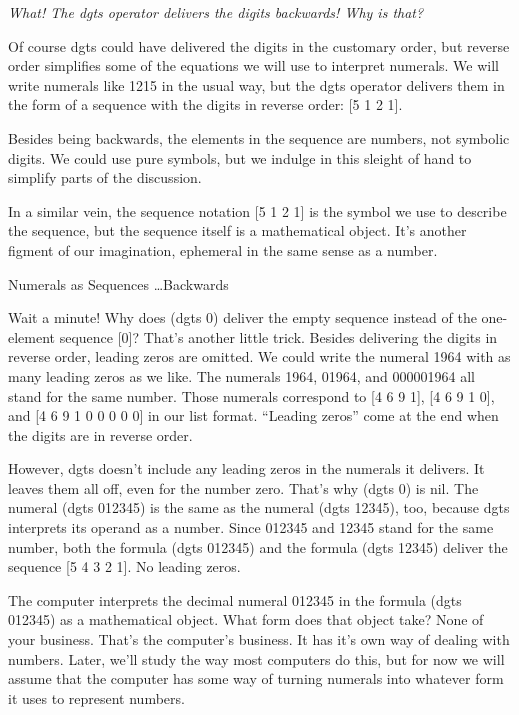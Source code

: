 \begin{aside}
\emph{What! The dgts operator delivers the digits backwards! Why is that?}

Of course
dgts
could have delivered the digits in the
customary order, but reverse order simplifies some of the
equations we will use to interpret numerals.
We will write numerals like 1215 in the usual way, but
the dgts operator delivers them in the form of
a sequence with the digits in reverse order: [5 1 2 1].

Besides being backwards, the elements in the sequence are numbers,
not symbolic digits.
We could use pure symbols, but we indulge in
this sleight of hand to
simplify parts of the discussion.

In a similar vein, the sequence notation [5 1 2 1] is the symbol we use
to describe the sequence,
but the sequence itself is a mathematical object.
It's another figment of our imagination,
ephemeral in the same sense as a number.
\caption{Numerals as Sequences \dots Backwards}
\label{numeral-as-sequence}
\end{aside}

Wait a minute!
Why does (dgts 0) deliver the empty sequence instead of the one-element sequence [0]?
That's another little trick.
Besides delivering the digits in reverse order,
leading zeros are omitted.
We could write the numeral 1964 with as many leading zeros as we like.
The numerals 1964, 01964, and 000001964 all stand for the same number.
Those numerals correspond to [4 6 9 1], [4 6 9 1 0], and [4 6 9 1 0 0 0 0 0]
in our list format. ``Leading zeros'' come at the end when the
digits are in reverse order.

However, dgts doesn't include any
 leading zeros
in the numerals it delivers.
It leaves them all off, even for the number zero.
That's why (dgts 0) is nil.
The numeral (dgts 012345) is the same as the numeral (dgts 12345), too,
because dgts interprets its operand as a number.
Since 012345 and 12345 stand for the same number,
both the formula (dgts 012345) and the formula (dgts 12345)
deliver the sequence [5 4 3 2 1].
No leading zeros.

The computer interprets the decimal numeral 012345 in the formula (dgts 012345)
as a mathematical object.
What form does that object take? None of your business.
That's the computer's business.
It has it's own way of dealing with numbers.
Later, we'll study the way most computers do this,
but for now we will assume that the computer has some way of turning
numerals into whatever form it uses to represent numbers.

